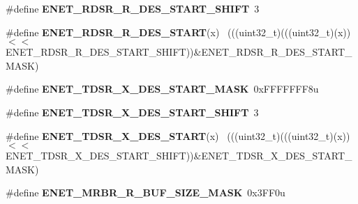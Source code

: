 \begin{DoxyCompactItemize}
\item 
\hypertarget{group___e_n_e_t___register___masks_ga1afaef178575034556d8e580d5fe0c84}{}\#define {\bfseries E\+N\+E\+T\+\_\+\+R\+D\+S\+R\+\_\+\+R\+\_\+\+D\+E\+S\+\_\+\+S\+T\+A\+R\+T\+\_\+\+S\+H\+I\+F\+T}~3\label{group___e_n_e_t___register___masks_ga1afaef178575034556d8e580d5fe0c84}

\item 
\hypertarget{group___e_n_e_t___register___masks_ga076e8c92ca48e95725c43dafce49a8b2}{}\#define {\bfseries E\+N\+E\+T\+\_\+\+R\+D\+S\+R\+\_\+\+R\+\_\+\+D\+E\+S\+\_\+\+S\+T\+A\+R\+T}(x)                              ~(((uint32\+\_\+t)(((uint32\+\_\+t)(x))$<$$<$E\+N\+E\+T\+\_\+\+R\+D\+S\+R\+\_\+\+R\+\_\+\+D\+E\+S\+\_\+\+S\+T\+A\+R\+T\+\_\+\+S\+H\+I\+F\+T))\&E\+N\+E\+T\+\_\+\+R\+D\+S\+R\+\_\+\+R\+\_\+\+D\+E\+S\+\_\+\+S\+T\+A\+R\+T\+\_\+\+M\+A\+S\+K)\label{group___e_n_e_t___register___masks_ga076e8c92ca48e95725c43dafce49a8b2}

\item 
\hypertarget{group___e_n_e_t___register___masks_ga0fd3699cfea6036741e57fde2c14259b}{}\#define {\bfseries E\+N\+E\+T\+\_\+\+T\+D\+S\+R\+\_\+\+X\+\_\+\+D\+E\+S\+\_\+\+S\+T\+A\+R\+T\+\_\+\+M\+A\+S\+K}~0x\+F\+F\+F\+F\+F\+F\+F8u\label{group___e_n_e_t___register___masks_ga0fd3699cfea6036741e57fde2c14259b}

\item 
\hypertarget{group___e_n_e_t___register___masks_ga46f0734fb316af30bafaaaf1f33cc24a}{}\#define {\bfseries E\+N\+E\+T\+\_\+\+T\+D\+S\+R\+\_\+\+X\+\_\+\+D\+E\+S\+\_\+\+S\+T\+A\+R\+T\+\_\+\+S\+H\+I\+F\+T}~3\label{group___e_n_e_t___register___masks_ga46f0734fb316af30bafaaaf1f33cc24a}

\item 
\hypertarget{group___e_n_e_t___register___masks_ga88eeea9b6cacf4dda48362d3f39e3113}{}\#define {\bfseries E\+N\+E\+T\+\_\+\+T\+D\+S\+R\+\_\+\+X\+\_\+\+D\+E\+S\+\_\+\+S\+T\+A\+R\+T}(x)                              ~(((uint32\+\_\+t)(((uint32\+\_\+t)(x))$<$$<$E\+N\+E\+T\+\_\+\+T\+D\+S\+R\+\_\+\+X\+\_\+\+D\+E\+S\+\_\+\+S\+T\+A\+R\+T\+\_\+\+S\+H\+I\+F\+T))\&E\+N\+E\+T\+\_\+\+T\+D\+S\+R\+\_\+\+X\+\_\+\+D\+E\+S\+\_\+\+S\+T\+A\+R\+T\+\_\+\+M\+A\+S\+K)\label{group___e_n_e_t___register___masks_ga88eeea9b6cacf4dda48362d3f39e3113}

\item 
\hypertarget{group___e_n_e_t___register___masks_ga376edb2860d9c55545ca78616f7d81f3}{}\#define {\bfseries E\+N\+E\+T\+\_\+\+M\+R\+B\+R\+\_\+\+R\+\_\+\+B\+U\+F\+\_\+\+S\+I\+Z\+E\+\_\+\+M\+A\+S\+K}~0x3\+F\+F0u\label{group___e_n_e_t___register___masks_ga376edb2860d9c55545ca78616f7d81f3}


\end{DoxyCompactItemize}
